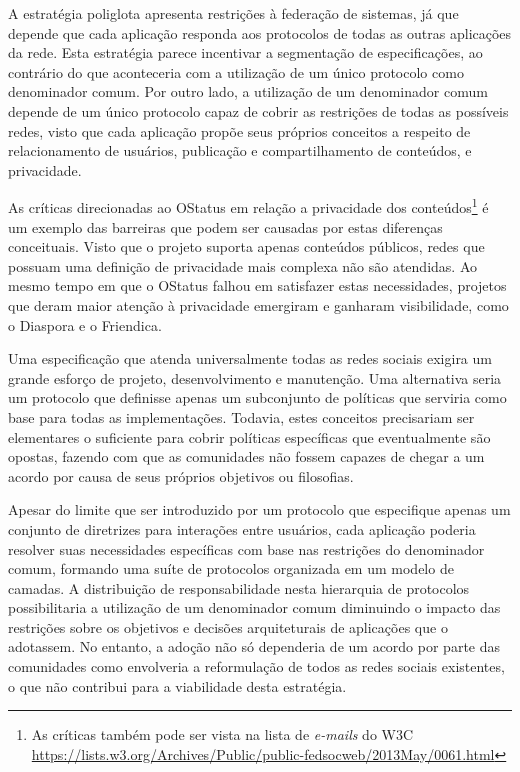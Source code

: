 A estratégia poliglota apresenta restrições à federação de sistemas, já que depende
que cada aplicação responda aos protocolos de todas as outras aplicações da rede.
Esta estratégia parece incentivar a segmentação de especificações, ao contrário do
que aconteceria com a utilização de um único protocolo como denominador comum. Por
outro lado, a utilização de um denominador comum depende de um único protocolo capaz
de cobrir as restrições de todas as possíveis redes, visto que cada aplicação propõe
seus próprios conceitos a respeito de relacionamento de usuários, publicação e
compartilhamento de conteúdos, e privacidade.

As críticas direcionadas ao OStatus em relação a privacidade dos
conteúdos\footnote{As críticas também pode ser vista na lista de \textit{e-mails} do
W3C \url{https://lists.w3.org/Archives/Public/public-fedsocweb/2013May/0061.html}} é
um exemplo das barreiras que podem ser causadas por estas diferenças conceituais.
Visto que o projeto suporta apenas conteúdos públicos, redes que possuam uma
definição de privacidade mais complexa não são atendidas. Ao mesmo tempo em que o
OStatus falhou em satisfazer estas necessidades, projetos que deram maior atenção à
privacidade emergiram e ganharam visibilidade, como o Diaspora e o Friendica.

Uma especificação que atenda universalmente todas as redes sociais exigira um grande
esforço de projeto, desenvolvimento e manutenção. Uma alternativa seria um protocolo
que definisse apenas um subconjunto de políticas que serviria como base para todas
as implementações. Todavia, estes conceitos precisariam ser elementares o suficiente
para cobrir políticas específicas que eventualmente são opostas, fazendo com que as
comunidades não fossem capazes de chegar a um acordo por causa de seus próprios
objetivos ou filosofias.

Apesar do limite que ser introduzido por um protocolo que especifique apenas um
conjunto de diretrizes para interações entre usuários, cada aplicação poderia
resolver suas necessidades específicas com base nas restrições do denominador comum,
formando uma suíte de protocolos organizada em um modelo de camadas. A distribuição
de responsabilidade nesta hierarquia de protocolos possibilitaria a utilização de um
denominador comum diminuindo o impacto das restrições sobre os objetivos e decisões
arquiteturais de aplicações que o adotassem. No entanto, a adoção não só dependeria
de um acordo por parte das comunidades como envolveria a reformulação de todos as
redes sociais existentes, o que não contribui para a viabilidade desta estratégia.

